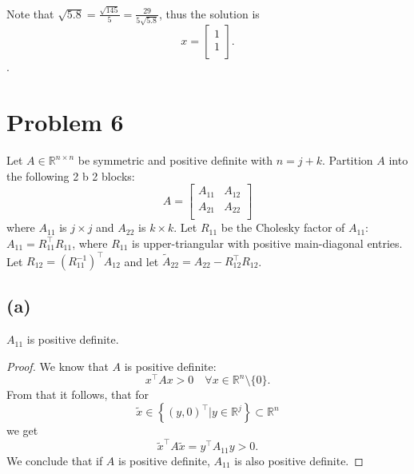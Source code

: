 \documentclass[a4paper, 11pt]{article}
\begin{document}
Note that $\sqrt{5.8} = \frac{\sqrt{145}}{5} = \frac{29}{5\sqrt{5.8}}$, thus
the solution is
\begin{equation*}
  x =
  \begin{bmatrix}
    1 \\
    1 \\
  \end{bmatrix}.
\end{equation*}.

\section*{Problem 6}
Let $A \in \mathbb{R}^{n \times n}$ be symmetric and positive definite with $n
= j + k$. Partition $A$ into the following 2 b 2 blocks:
\begin{equation*}
  A =
  \begin{bmatrix}
    A_{11} & A_{12} \\
    A_{21} & A_{22} \\
  \end{bmatrix}
\end{equation*}
where $A_{11}$ is $j \times j$ and $A_{22}$ is $k \times k$. Let $R_{11}$ be
the  Cholesky factor of $A_{11}$: $A_{11} =  R_{11}^\top R_{11}$, where
$R_{11}$ is upper-triangular with positive main-diagonal entries. Let $R_{12} =
(R_{11}^{-1})^\top A_{12}$ and let $\tilde{A}_{22} = A_{22} - R_{12}^\top
R_{12}$.

\subsection*{(a)}
$A_{11}$ is positive definite.
\begin{proof}
We know that $A$ is positive definite:
\begin{equation*}
  x^\top A x > 0 \quad \forall x \in \mathbb{R}^n \setminus \{0\}.
\end{equation*}
From that it follows, that for
\begin{equation*}
  \tilde{x} \in \left\{(y, 0)^\top \vert y \in \mathbb{R}^j\right\} \subset \mathbb{R}^n
\end{equation*}
we get
\begin{equation*}
  \tilde{x}^\top A \tilde{x} = y^\top A_{11} y > 0.
\end{equation*}
We conclude that if $A$ is positive definite, $A_{11}$ is also positive definite.
\end{proof}
\end{document}
